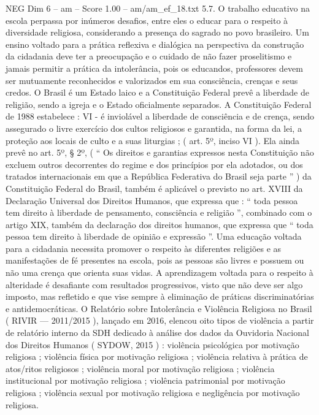 \begin{textsample}{NEG Dim 6 – am – Score 1.00 – am/am\_ef\_18.txt}  \label{ex:f6_neg_023}
5.7.
O trabalho educativo na escola perpassa por inúmeros desafios, entre eles o educar para o respeito à diversidade religiosa, considerando a presença do sagrado no povo brasileiro.
Um ensino voltado para a prática reflexiva e dialógica na perspectiva da construção da cidadania deve ter a preocupação e o cuidado de não fazer proselitismo e jamais permitir a prática da intolerância, pois os educandos, professores devem ser mutuamente reconhecidos e valorizados em sua consciência, crenças e seus credos.
O Brasil é um Estado laico e a Constituição Federal prevê a liberdade de religião, sendo a igreja e o Estado oficialmente separados.
A Constituição Federal de 1988 estabelece : VI - é inviolável a liberdade de consciência e de crença, sendo assegurado o livre exercício dos cultos religiosos e garantida, na forma da lei, a proteção aos locais de culto e a suas liturgias ; ( art. 5º, inciso VI ).
Ela ainda prevê no art. 5º, § 2º, ( “ Os direitos e garantias expressos nesta Constituição não excluem outros decorrentes do regime e dos princípios por ela adotados, ou dos tratados internacionais em que a República Federativa do Brasil seja parte ” ) da Constituição Federal do Brasil, também é aplicável o previsto no art.
XVIII da Declaração Universal dos Direitos Humanos, que expressa que : “ toda pessoa tem direito à liberdade de pensamento, consciência e religião ”, combinado com o artigo XIX, também da declaração dos direitos humanos, que expressa que “ toda pessoa tem direito à liberdade de opinião e expressão ”.
Uma educação voltada para a cidadania necessita promover o respeito às diferentes religiões e as manifestações de fé presentes na escola, pois as pessoas são livres e possuem ou não uma crença que orienta suas vidas.
A aprendizagem voltada para o respeito à alteridade é desafiante com resultados progressivos, visto que não deve ser algo imposto, mas refletido e que vise sempre à eliminação de práticas discriminatórias e antidemocráticas.
O Relatório sobre Intolerância e Violência Religiosa no Brasil ( RIVIR — 2011/2015 ), lançado em 2016, elencou oito tipos de violência a partir de relatório interno da SDH dedicado à análise dos dados da Ouvidoria Nacional dos Direitos Humanos ( SYDOW, 2015 ) : violência psicológica por motivação religiosa ; violência física por motivação religiosa ; violência relativa à prática de atos/ritos religiosos ; violência moral por motivação religiosa ; violência institucional por motivação religiosa ; violência patrimonial por motivação religiosa ; violência sexual por motivação religiosa e negligência por motivação religiosa.

\end{textsample}
